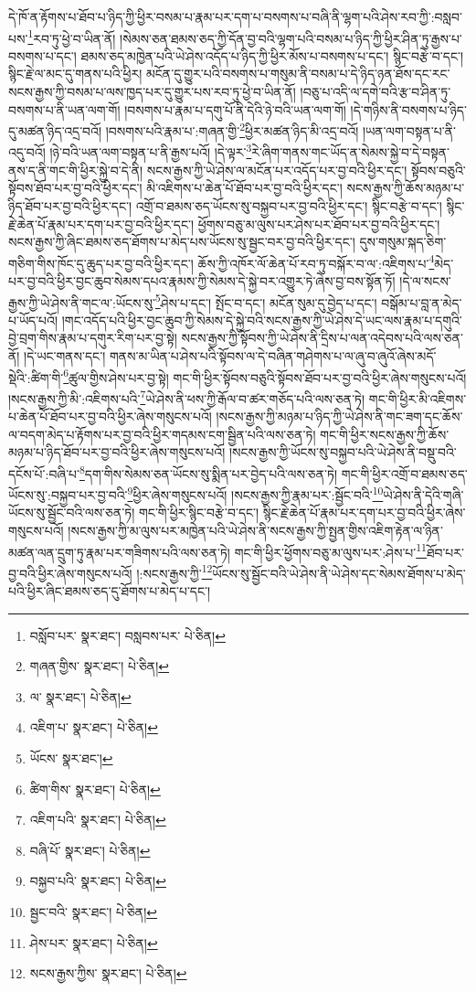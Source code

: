 དེ་ཁོ་ན་རྟོགས་པ་ཐོབ་པ་ཉིད་ཀྱི་ཕྱིར་བསམ་པ་རྣམ་པར་དག་པ་བསགས་པ་བཞི་ནི་ལྷག་པའི་ཤེས་རབ་ཀྱི་:བསླབ་པས་\footnote{བསློབ་པར་  སྣར་ཐང་། བསླབས་པར་  པེ་ཅིན། }རབ་ཏུ་ཕྱེ་བ་ཡིན་ནོ། །སེམས་ཅན་ཐམས་ཅད་ཀྱི་དོན་བྱ་བའི་ལྷག་པའི་བསམ་པ་ཉིད་ཀྱི་ཕྱིར་ཤིན་ཏུ་རྒྱས་པ་བསགས་པ་དང་། ཐམས་ཅད་མཁྱེན་པའི་ཡེ་ཤེས་འདོད་པ་ཉིད་ཀྱི་ཕྱིར་མོས་པ་བསགས་པ་དང་། སྙིང་བརྩེ་བ་དང་། སྙིང་རྗེ་ལ་མང་དུ་གནས་པའི་ཕྱིར། མངོན་དུ་གྱུར་པའི་བསགས་པ་གསུམ་ནི་བསམ་པ་དེ་ཉིད་ཉན་ཐོས་དང་རང་སངས་རྒྱས་ཀྱི་བསམ་པ་ལས་ཁྱད་པར་དུ་གྱུར་པས་རབ་ཏུ་ཕྱེ་བ་ཡིན་ནོ། །བཅུ་པ་འདི་ལ་དགེ་བའི་རྩ་བ་ཤིན་ཏུ་བསགས་པ་ནི་ཡན་ལག་གོ། །བསགས་པ་རྣམ་པ་དགུ་པོ་ནི་དེའི་ཉེ་བའི་ཡན་ལག་གོ། །དེ་གཉིས་ནི་བསགས་པ་ཉིད་དུ་མཚན་ཉིད་འདྲ་བའོ། །བསགས་པའི་རྣམ་པ་:གཞན་གྱི་\footnote{གཞན་གྱིས་  སྣར་ཐང་།  པེ་ཅིན། }ཕྱིར་མཚན་ཉིད་མི་འདྲ་བའོ། །ཡན་ལག་བསྟན་པ་ནི་འདུ་བའོ། །ཉེ་བའི་ཡན་ལག་བསྟན་པ་ནི་རྒྱས་པའོ། །དེ་ལྟར་\footnote{ལ་  སྣར་ཐང་།  པེ་ཅིན། }རེ་ཞིག་གནས་གང་ཡོད་ན་སེམས་སྐྱེ་བ་དེ་བསྟན་ནས་ད་ནི་གང་གི་ཕྱིར་སྐྱེ་བ་དེ་ནི། སངས་རྒྱས་ཀྱི་ཡེ་ཤེས་ལ་མངོན་པར་འདོད་པར་བྱ་བའི་ཕྱིར་དང་། སྟོབས་བཅུའི་སྟོབས་ཐོབ་པར་བྱ་བའི་ཕྱིར་དང་། མི་འཇིགས་པ་ཆེན་པོ་ཐོབ་པར་བྱ་བའི་ཕྱིར་དང་། སངས་རྒྱས་ཀྱི་ཆོས་མཉམ་པ་ཉིད་ཐོབ་པར་བྱ་བའི་ཕྱིར་དང་། འགྲོ་བ་ཐམས་ཅད་ཡོངས་སུ་བསྐྱབ་པར་བྱ་བའི་ཕྱིར་དང་། སྙིང་བརྩེ་བ་དང་། སྙིང་རྗེ་ཆེན་པོ་རྣམ་པར་དག་པར་བྱ་བའི་ཕྱིར་དང་། ཕྱོགས་བཅུ་མ་ལུས་པར་ཤེས་པར་ཐོབ་པར་བྱ་བའི་ཕྱིར་དང་། སངས་རྒྱས་ཀྱི་ཞིང་ཐམས་ཅད་ཐོགས་པ་མེད་པས་ཡོངས་སུ་སྦྱང་བར་བྱ་བའི་ཕྱིར་དང་། དུས་གསུམ་སྐད་ཅིག་གཅིག་གིས་ཁོང་དུ་ཆུད་པར་བྱ་བའི་ཕྱིར་དང་། ཆོས་ཀྱི་འཁོར་ལོ་ཆེན་པོ་རབ་ཏུ་བསྐོར་བ་ལ་:འཇིགས་པ་\footnote{འཇིག་པ་  སྣར་ཐང་།  པེ་ཅིན། }མེད་པར་བྱ་བའི་ཕྱིར་བྱང་ཆུབ་སེམས་དཔའ་རྣམས་ཀྱི་སེམས་དེ་སྐྱེ་བར་འགྱུར་ཏེ་ཞེས་བྱ་བས་སྟོན་ཏོ། །དེ་ལ་སངས་རྒྱས་ཀྱི་ཡེ་ཤེས་ནི་གང་ལ་:ཡོངས་སུ་\footnote{ཡོངས་  སྣར་ཐང་། }ཤེས་པ་དང་། སྤོང་བ་དང་། མངོན་སུམ་དུ་བྱེད་པ་དང་། བསྒོམ་པ་བླ་ན་མེད་པ་ཡོད་པའོ། །གང་འདོད་པའི་ཕྱིར་བྱང་ཆུབ་ཀྱི་སེམས་དེ་སྐྱེ་བའི་སངས་རྒྱས་ཀྱི་ཡེ་ཤེས་དེ་ཡང་ལས་རྣམ་པ་དགུའི་བྱེ་བྲག་གིས་རྣམ་པ་དགུར་རིག་པར་བྱ་སྟེ། སངས་རྒྱས་ཀྱི་སྟོབས་ཀྱི་ཡེ་ཤེས་ནི་དྲིས་པ་ལན་འདེབས་པའི་ལས་ཅན་ནོ། །དེ་ཡང་གནས་དང་། གནས་མ་ཡིན་པ་ཤེས་པའི་སྟོབས་ལ་དེ་བཞིན་གཤེགས་པ་ལ་ཞུ་བ་ཞུའོ་ཞེས་མདོ་སྡེའི་:ཚིག་གི་\footnote{ཚིག་གིས་  སྣར་ཐང་།  པེ་ཅིན། }ཚུལ་གྱིས་ཤེས་པར་བྱ་སྟེ། གང་གི་ཕྱིར་སྟོབས་བཅུའི་སྟོབས་ཐོབ་པར་བྱ་བའི་ཕྱིར་ཞེས་གསུངས་པའོ། །སངས་རྒྱས་ཀྱི་མི་:འཇིགས་པའི་\footnote{འཇིག་པའི་  སྣར་ཐང་།  པེ་ཅིན། }ཡེ་ཤེས་ནི་ཕས་ཀྱི་རྒོལ་བ་ཚར་གཅོད་པའི་ལས་ཅན་ཏེ། གང་གི་ཕྱིར་མི་འཇིགས་པ་ཆེན་པོ་ཐོབ་པར་བྱ་བའི་ཕྱིར་ཞེས་གསུངས་པའོ། །སངས་རྒྱས་ཀྱི་མཉམ་པ་ཉིད་ཀྱི་ཡེ་ཤེས་ནི་གང་ཟག་དང་ཆོས་ལ་བདག་མེད་པ་རྟོགས་པར་བྱ་བའི་ཕྱིར་གདམས་ངག་སྦྱིན་པའི་ལས་ཅན་ཏེ། གང་གི་ཕྱིར་སངས་རྒྱས་ཀྱི་ཆོས་མཉམ་པ་ཉིད་ཐོབ་པར་བྱ་བའི་ཕྱིར་ཞེས་གསུངས་པའོ། །སངས་རྒྱས་ཀྱི་ཡོངས་སུ་བསྐྱབ་པའི་ཡེ་ཤེས་ནི་བསྡུ་བའི་དངོས་པོ་:བཞི་པ་\footnote{བཞི་པོ་  སྣར་ཐང་།  པེ་ཅིན། }དག་གིས་སེམས་ཅན་ཡོངས་སུ་སྨིན་པར་བྱེད་པའི་ལས་ཅན་ཏེ། གང་གི་ཕྱིར་འགྲོ་བ་ཐམས་ཅད་ཡོངས་སུ་:བསྐྱབ་པར་བྱ་བའི་\footnote{བསྐྱབ་པའི་  སྣར་ཐང་།  པེ་ཅིན། }ཕྱིར་ཞེས་གསུངས་པའོ། །སངས་རྒྱས་ཀྱི་རྣམ་པར་:སྦྱོང་བའི་\footnote{སྦྱང་བའི་  སྣར་ཐང་།  པེ་ཅིན། }ཡེ་ཤེས་ནི་དེའི་གཞི་ཡོངས་སུ་སྦྱོང་བའི་ལས་ཅན་ཏེ། གང་གི་ཕྱིར་སྙིང་བརྩེ་བ་དང་། སྙིང་རྗེ་ཆེན་པོ་རྣམ་པར་དག་པར་བྱ་བའི་ཕྱིར་ཞེས་གསུངས་པའོ། །སངས་རྒྱས་ཀྱི་མ་ལུས་པར་མཁྱེན་པའི་ཡེ་ཤེས་ནི་སངས་རྒྱས་ཀྱི་སྤྱན་གྱིས་འཇིག་རྟེན་ལ་ཉིན་མཚན་ལན་དྲུག་ཏུ་རྣམ་པར་གཟིགས་པའི་ལས་ཅན་ཏེ། གང་གི་ཕྱིར་ཕྱོགས་བཅུ་མ་ལུས་པར་:ཤེས་པ་\footnote{ཤེས་པར་  སྣར་ཐང་།  པེ་ཅིན། }ཐོབ་པར་བྱ་བའི་ཕྱིར་ཞེས་གསུངས་པའོ། །:སངས་རྒྱས་ཀྱི་\footnote{སངས་རྒྱས་ཀྱིས་  སྣར་ཐང་།  པེ་ཅིན། }ཡོངས་སུ་སྦྱོང་བའི་ཡེ་ཤེས་ནི་ཡེ་ཤེས་དང་སེམས་ཐོགས་པ་མེད་པའི་ཕྱིར་ཞིང་ཐམས་ཅད་དུ་ཐོགས་པ་མེད་པ་དང་། 